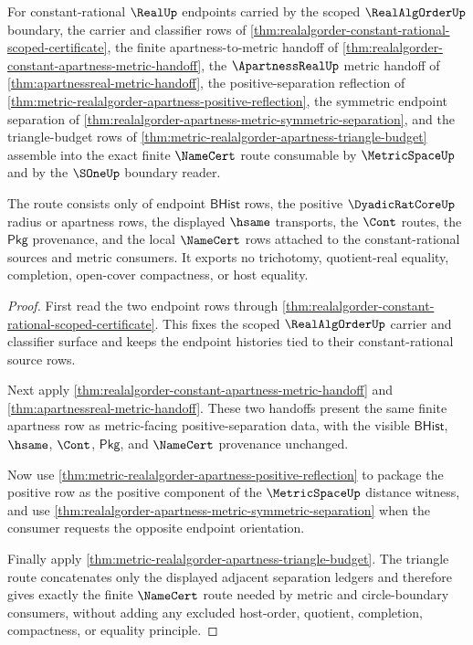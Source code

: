 \begin{theorem}
\label{thm:realalgorder-apartness-metric-namecert-route}
For constant-rational $\RealUp$ endpoints carried by the scoped
$\RealAlgOrderUp$ boundary, the carrier and classifier rows of
\autoref{thm:realalgorder-constant-rational-scoped-certificate}, the finite
apartness-to-metric handoff of
\autoref{thm:realalgorder-constant-apartness-metric-handoff}, the
$\ApartnessRealUp$ metric handoff of \autoref{thm:apartnessreal-metric-handoff},
the positive-separation reflection of
\autoref{thm:metric-realalgorder-apartness-positive-reflection}, the symmetric
endpoint separation of
\autoref{thm:realalgorder-apartness-metric-symmetric-separation}, and the
triangle-budget rows of \autoref{thm:metric-realalgorder-apartness-triangle-budget}
assemble into the exact finite $\NameCert$ route consumable by
$\MetricSpaceUp$ and by the $\SOneUp$ boundary reader.

The route consists only of endpoint $\mathsf{BHist}$ rows, the positive
$\DyadicRatCoreUp$ radius or apartness rows, the displayed $\hsame$ transports,
the $\Cont$ routes, the $\mathsf{Pkg}$ provenance, and the local $\NameCert$
rows attached to the constant-rational sources and metric consumers. It exports
no trichotomy, quotient-real equality, completion, open-cover compactness, or
host equality.
\end{theorem}
\begin{proof}
First read the two endpoint rows through
\autoref{thm:realalgorder-constant-rational-scoped-certificate}. This fixes the
scoped $\RealAlgOrderUp$ carrier and classifier surface and keeps the endpoint
histories tied to their constant-rational source rows.

Next apply \autoref{thm:realalgorder-constant-apartness-metric-handoff} and
\autoref{thm:apartnessreal-metric-handoff}. These two handoffs present the same
finite apartness row as metric-facing positive-separation data, with the
visible $\mathsf{BHist}$, $\hsame$, $\Cont$, $\mathsf{Pkg}$, and $\NameCert$
provenance unchanged.

Now use \autoref{thm:metric-realalgorder-apartness-positive-reflection} to
package the positive row as the positive component of the $\MetricSpaceUp$
distance witness, and use
\autoref{thm:realalgorder-apartness-metric-symmetric-separation} when the
consumer requests the opposite endpoint orientation.

Finally apply \autoref{thm:metric-realalgorder-apartness-triangle-budget}. The
triangle route concatenates only the displayed adjacent separation ledgers and
therefore gives exactly the finite $\NameCert$ route needed by metric and
circle-boundary consumers, without adding any excluded host-order, quotient,
completion, compactness, or equality principle.
\end{proof}
